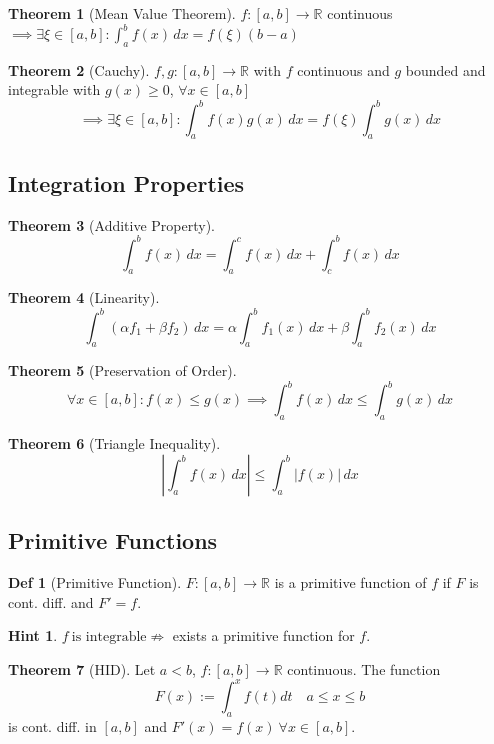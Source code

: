 \documentclass[a4paper, 10pt]{article}
\theoremstyle{definition}
\newtheorem*{definition}{Def}
\newtheorem*{note_wrapper}{Hint}
\theoremstyle{named}
\newtheorem*{ntheorem_wrapper}{Theorem}
\newenvironment{ntheorem}%
    {\begin{mdframed}[style=important]\begin{ntheorem_wrapper}}%
    {\end{ntheorem_wrapper}\end{mdframed}}
\newenvironment{note}%
    {\begin{mdframed}[style=trick]\begin{note_wrapper}}%
    {\end{note_wrapper}\end{mdframed}}
\newcommand{\R}{\mathbb{R}}
\begin{document}
\begin{ntheorem}[Mean Value Theorem]
    $f: [a, b] \to \R$ continuous $\implies \exists \xi \in [a, b]: \int_a^b f(x) \,dx = f(\xi)(b - a)$
\end{ntheorem}
\begin{ntheorem}[Cauchy]
    $f, g: [a, b] \to \R$ with $f$ continuous and $g$ bounded and integrable with $g(x) \geq 0$, $\forall x \in [a, b]$
    $$\implies \exists \xi \in [a, b]: \int_a^b f(x)g(x) \,dx = f(\xi)\int_a^b g(x) \,dx$$
\end{ntheorem}

\subsection{Integration Properties}
\begin{ntheorem}[Additive Property]
    $$\int_a^b f(x) \,dx = \int_a^c f(x) \,dx + \int_c^b f(x) \,dx$$
\end{ntheorem}

\begin{ntheorem}[Linearity]
    $$\int_a^b(\alpha f_1 + \beta f_2) \,dx = \alpha \int_a^b f_1(x) \,dx + \beta \int_a^b f_2(x) \,dx$$
\end{ntheorem}

\begin{ntheorem}[Preservation of Order]
    $$\forall x \in [a, b]: f(x) \leq g(x) \implies \int_a^b f(x) \,dx \leq \int_a^b g(x) \,dx$$
\end{ntheorem}

\begin{ntheorem}[Triangle Inequality]
    $$\left|\int_a^b f(x) \,dx\right| \leq \int_a^b |f(x)| \,dx$$
\end{ntheorem}

\subsection{Primitive Functions}
\begin{definition}[Primitive Function]
    $F: [a, b] \to \R$ is a primitive function of $f$ if $F$ is cont. diff. and $F' = f$.
\end{definition}

\begin{note}
    $f \ \text{is integrable} \not\Rightarrow$ exists a primitive function for $f$.
\end{note}

\begin{ntheorem}[HID]
    Let $a < b$, $f: [a, b] \to \R$ continuous. The function 
    $$F(x) := \int_a^x f(t) dt \quad a \leq x \leq b$$
    is cont. diff. in $[a, b]$ and $F'(x) = f(x) \ \forall x \in [a, b]$.
\end{ntheorem}
\end{document}
